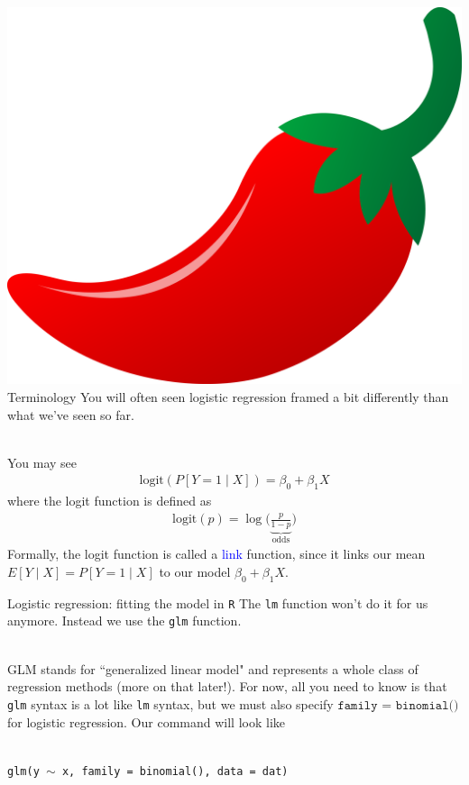 \documentclass[10pt,t]{beamer}
\begin{document}
\begin{frame}{\includegraphics[scale=0.01]{./figs/chilipepper} Terminology}
	You will often seen logistic regression framed a bit differently than what we've seen so far. \pause
	\\ ~\ 
	
	You may see
	\begin{align*}
		\text{logit}(P[Y = 1 \mid X]) = \beta_0 + \beta_1 X
	\end{align*}
where the logit function is defined as \pause
\begin{align*}
	\text{logit}(p) = \log\Big(\underbrace{\frac{p}{1-p}}_{\text{odds}}\Big)
\end{align*}
\pause
Formally, the logit function is called a \textcolor{blue}{link} function, since it links our mean $E[Y \mid X] = P[Y = 1 \mid X]$ to our model $\beta_0 + \beta_1 X$. 
\end{frame}

\begin{frame}{Logistic regression: fitting the model in \texttt{R}}
	The \texttt{lm} function won't do it for us anymore. Instead we use the \texttt{glm} function. 
	\\ ~\ 
	
	GLM stands for ``generalized linear model" and represents a whole class of regression methods (more on that later!). For now, all you need to know is that \texttt{glm} syntax is a lot like \texttt{lm} syntax, but we must also specify $\texttt{family = binomial()}$ for logistic regression. Our command will look like
	\\ ~\
	
	\texttt{glm(y $\sim$ x, family = binomial(), data = dat)}
\end{frame}
\end{document}

